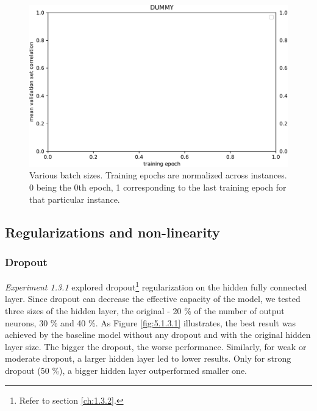 \begin{figure}[H]
    \centering
    \includegraphics[width=1\textwidth]{../figures/05_dummy}
    \caption[Experiment 1.2.6]{Various batch sizes. Training epochs are normalized across instances. 0 being the 0th epoch, 1 corresponding to the last training epoch for that particular instance.}
    \label{fig:5.1.2.6}
\end{figure}

\subsection{Regularizations and non-linearity}
\subsubsection{Dropout}

\textit{Experiment 1.3.1} explored dropout\footnote{Refer to section \ref{ch:1.3.2}.} regularization on the hidden fully connected layer. Since dropout can decrease the effective capacity of the model, we tested three sizes of the hidden layer, the original - 20 \% of the number of output neurons, 30 \% and 40 \%. As Figure \ref{fig:5.1.3.1} illustrates, the best result was achieved by the baseline model without any dropout and with the original hidden layer size. The bigger the dropout, the worse performance. Similarly, for weak or moderate dropout, a larger hidden layer led to lower results. Only for strong dropout (50 \%), a bigger hidden layer outperformed smaller one.



